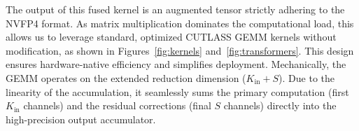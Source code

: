 \documentclass[11pt]{article}
\begin{document}
The output of this fused kernel is an augmented tensor strictly adhering to the NVFP4 format. As matrix multiplication dominates the computational load, this allows us to leverage standard, optimized CUTLASS GEMM kernels without modification, as shown in Figures~\ref{fig:kernels} and~\ref{fig:transformers}. This design ensures hardware-native efficiency and simplifies deployment. 
Mechanically, the GEMM operates on the extended reduction dimension ($K_{\text{in}} + S$). Due to the linearity of the accumulation, it seamlessly sums the primary computation (first $K_{\text{in}}$ channels) and the residual corrections (final $S$ channels) directly into the high-precision output accumulator.






\end{document}
